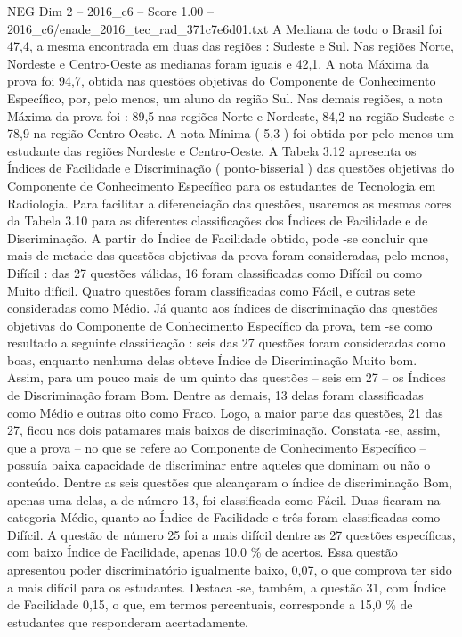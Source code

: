 \begin{textsample}{NEG Dim 2 – 2016\_c6 – Score 1.00 – 2016\_c6/enade\_2016\_tec\_rad\_371c7e6d01.txt}
A Mediana de todo o Brasil foi 47,4, a mesma encontrada em duas das regiões : Sudeste e Sul.
Nas regiões Norte, Nordeste e Centro-Oeste as medianas foram iguais e 42,1.
A nota Máxima da prova foi 94,7, obtida nas questões objetivas do Componente de Conhecimento Específico, por, pelo menos, um aluno da região Sul.
Nas demais regiões, a nota Máxima da prova foi : 89,5 nas regiões Norte e Nordeste, 84,2 na região Sudeste e 78,9 na região Centro-Oeste.
A nota Mínima ( 5,3 ) foi obtida por pelo menos um estudante das regiões Nordeste e Centro-Oeste.
A Tabela 3.12 apresenta os Índices de Facilidade e Discriminação ( ponto-bisserial ) das questões objetivas do Componente de Conhecimento Específico para os estudantes de Tecnologia em Radiologia.
Para facilitar a diferenciação das questões, usaremos as mesmas cores da Tabela 3.10 para as diferentes classificações dos Índices de Facilidade e de Discriminação.
A partir do Índice de Facilidade obtido, pode -se concluir que mais de metade das questões objetivas da prova foram consideradas, pelo menos, Difícil : das 27 questões válidas, 16 foram classificadas como Difícil ou como Muito difícil.
Quatro questões foram classificadas como Fácil, e outras sete consideradas como Médio.
Já quanto aos índices de discriminação das questões objetivas do Componente de Conhecimento Específico da prova, tem -se como resultado a seguinte classificação : seis das 27 questões foram consideradas como boas, enquanto nenhuma delas obteve Índice de Discriminação Muito bom.
Assim, para um pouco mais de um quinto das questões – seis em 27 – os Índices de Discriminação foram Bom.
Dentre as demais, 13 delas foram classificadas como Médio e outras oito como Fraco.
Logo, a maior parte das questões, 21 das 27, ficou nos dois patamares mais baixos de discriminação.
Constata -se, assim, que a prova – no que se refere ao Componente de Conhecimento Específico – possuía baixa capacidade de discriminar entre aqueles que dominam ou não o conteúdo.
Dentre as seis questões que alcançaram o índice de discriminação Bom, apenas uma delas, a de número 13, foi classificada como Fácil.
Duas ficaram na categoria Médio, quanto ao Índice de Facilidade e três foram classificadas como Difícil.
A questão de número 25 foi a mais difícil dentre as 27 questões específicas, com baixo Índice de Facilidade, apenas 10,0 \% de acertos.
Essa questão apresentou poder discriminatório igualmente baixo, 0,07, o que comprova ter sido a mais difícil para os estudantes.
Destaca -se, também, a questão 31, com Índice de Facilidade 0,15, o que, em termos percentuais, corresponde a 15,0 \% de estudantes que responderam acertadamente.

\end{textsample}
